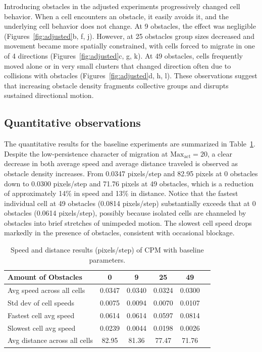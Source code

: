 \documentclass{article}
\begin{document}
Introducing obstacles in the adjusted experiments progressively changed cell behavior.
When a cell encounters an obstacle, it easily avoids it, and the underlying cell behavior does not change.
At 9 obstacles, the effect was negligible (Figures~\ref{fig:adjusted}b, f, j). However, at 25 obstacles group sizes decreased and movement became more spatially constrained, with cells forced to migrate in one of 4 directions
(Figures~\ref{fig:adjusted}c, g, k). At 49 obstacles, cells frequently moved alone or in very
small clusters that changed direction often due to collisions with obstacles (Figures~\ref{fig:adjusted}d, h, l).
These observations suggest that increasing obstacle density fragments collective groups and disrupts sustained directional motion.

\subsection*{Quantitative observations}
The quantitative results for the baseline experiments are summarized in Table~\ref{tab:baseline}.
Despite the low-persistence character of migration at $\text{Max}_\text{act} = 20$,
a clear decrease in both average speed and average distance traveled is observed as
obstacle density increases. From 0.0347 pixels/step and 82.95 pixels at 0 obstacles down to
0.0300 pixels/step and 71.76 pixels at 49 obstacles, which is a reduction of approximately
14\% in speed and 13\% in distance. Notice that the fastest individual cell at 49 obstacles 
(0.0814 pixels/step) substantially exceeds that at 0 obstacles (0.0614 pixels/step), possibly 
because isolated cells are channeled by obstacles into brief stretches of unimpeded motion. 
The slowest cell speed drops markedly in the presence of obstacles, consistent with occasional blockage.

\begin{table}[h!]
    \centering
    \caption{Speed and distance results (pixels/step) of CPM with baseline parameters.}
    \label{tab:baseline}
    \begin{tabular}{lccccc}
        \toprule
        \textbf{Amount of Obstacles} & \textbf{0} & \textbf{9} & \textbf{25} & \textbf{49}\\
        \midrule
        Avg speed across all cells & 0.0347 & 0.0340 & 0.0324 & 0.0300\\
        Std dev of cell speeds & 0.0075 & 0.0094 & 0.0070 & 0.0107\\
        Fastest cell avg speed & 0.0614 & 0.0614 & 0.0597 & 0.0814\\
        Slowest cell avg speed & 0.0239 & 0.0044 & 0.0198 & 0.0026\\
        Avg distance across all cells & 82.95 & 81.36 & 77.47 & 71.76\\
        \bottomrule
    \end{tabular}
\end{table}
\end{document}

